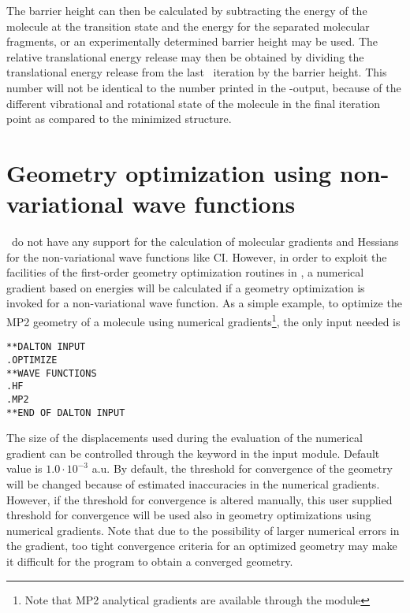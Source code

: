 The barrier height can then be calculated by subtracting the energy of
the molecule at the transition state and the energy for the separated
molecular fragments, or an experimentally determined barrier height
may be used. The relative translational energy release may then be
obtained  by dividing the translational energy release
from the last \dalton\ iteration by the barrier height. This number will
not be identical to the number printed in the \dalton -output, because
of the different vibrational and rotational state of
the molecule in the final iteration point as compared to the minimized
structure.

\section{Geometry optimization using non-variational wave
functions}\label{sec:nonvargeom}

\dalton\ do not have any support for the calculation of molecular
gradients and Hessians for the non-variational wave functions like
CI. However, in order to
exploit the facilities of the first-order
geometry optimization routines in {\dalton}, a numerical
gradient based
on energies will be calculated if a geometry optimization is invoked
for a non-variational wave function. As a simple example, to optimize
the MP2 geometry of a molecule using numerical gradients\footnote{Note
that MP2 analytical gradients are available through the {\cc}
module}, the only input needed is

\begin{verbatim}
**DALTON INPUT
.OPTIMIZE
**WAVE FUNCTIONS
.HF
.MP2
**END OF DALTON INPUT
\end{verbatim}

The size of the displacements used during the evaluation of the
numerical gradient can be controlled through the keyword
 in the  input module. Default value is
$1.0\cdot 10^{-3}$ a.u. By default, the threshold for convergence
of the geometry will be changed because of estimated inaccuracies
in the numerical gradients. However, if the threshold for
convergence is altered manually, this user supplied threshold for
convergence will be used also in geometry optimizations using
numerical gradients. Note that due to
the possibility of larger numerical errors in the gradient, too
tight convergence criteria for an optimized geometry may make it
difficult for the program to obtain a converged geometry.
